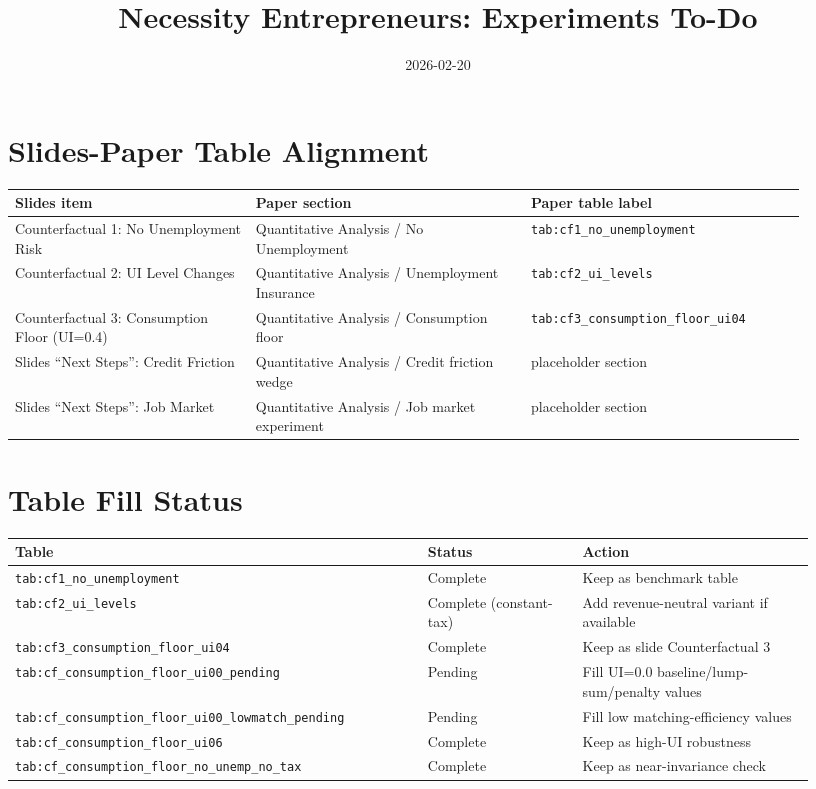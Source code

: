 \documentclass[11pt]{article}
\title{Necessity Entrepreneurs: Experiments To-Do}
\date{2026-02-20}
\begin{document}
\maketitle

\section*{Slides-Paper Table Alignment}
\begin{tabular}{p{0.28\linewidth} p{0.32\linewidth} p{0.32\linewidth}}
\toprule
Slides item & Paper section & Paper table label \\
\midrule
Counterfactual 1: No Unemployment Risk & Quantitative Analysis / No Unemployment & \texttt{tab:cf1\_no\_unemployment} \\
Counterfactual 2: UI Level Changes & Quantitative Analysis / Unemployment Insurance & \texttt{tab:cf2\_ui\_levels} \\
Counterfactual 3: Consumption Floor (UI=0.4) & Quantitative Analysis / Consumption floor & \texttt{tab:cf3\_consumption\_floor\_ui04} \\
Slides ``Next Steps'': Credit Friction & Quantitative Analysis / Credit friction wedge & placeholder section \\
Slides ``Next Steps'': Job Market & Quantitative Analysis / Job market experiment & placeholder section \\
\bottomrule
\end{tabular}

\section*{Table Fill Status}
\begin{tabular}{p{0.48\linewidth} p{0.18\linewidth} p{0.27\linewidth}}
\toprule
Table & Status & Action \\
\midrule
\texttt{tab:cf1\_no\_unemployment} & Complete & Keep as benchmark table \\
\texttt{tab:cf2\_ui\_levels} & Complete (constant-tax) & Add revenue-neutral variant if available \\
\texttt{tab:cf3\_consumption\_floor\_ui04} & Complete & Keep as slide Counterfactual 3 \\
\texttt{tab:cf\_consumption\_floor\_ui00\_pending} & Pending & Fill UI=0.0 baseline/lump-sum/penalty values \\
\texttt{tab:cf\_consumption\_floor\_ui00\_lowmatch\_pending} & Pending & Fill low matching-efficiency values \\
\texttt{tab:cf\_consumption\_floor\_ui06} & Complete & Keep as high-UI robustness \\
\texttt{tab:cf\_consumption\_floor\_no\_unemp\_no\_tax} & Complete & Keep as near-invariance check \\
\bottomrule
\end{tabular}
\end{document}
